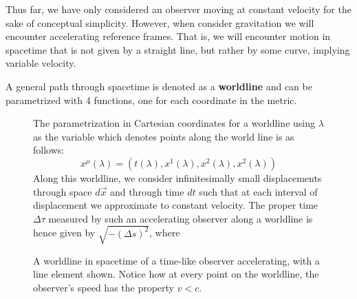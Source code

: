 \documentclass{article}
\begin{document}
 		Thus far, we have only considered an observer moving at constant velocity for the sake of conceptual simplicity. However, when consider gravitation we will encounter accelerating reference frames. That is, we will encounter motion in spacetime that is not given by a straight line, but rather by some curve, implying variable velocity. 
 		\begin{defn}
 			A general path through spacetime is denoted as a \textbf{worldline} and can be parametrized with 4 functions, one for each coordinate in the metric.
 		\end{defn}
 		\begin{figure}[h]
 			\begin{minipage}{0.4\textwidth}
 				\center
 				\caption{A worldline in spacetime of a time-like observer accelerating, with a line element shown. Notice how at every point on the worldline, the observer's speed has the property $v<c$.}
 			\end{minipage}
 			\hfill
 			\begin{minipage}{0.56\textwidth}
 				\begin{spacing}{1.5}
 					The parametrization in Cartesian coordinates for a worldline using $\lambda$ as the variable which denotes points along the world line is as follows:
 					$$ x^\mu (\lambda) = \left(t(\lambda), x^1 (\lambda), x^2(\lambda), x^2 (\lambda)\right)$$
 					Along this worldline, we consider infinitesimally small displacements through space $d\vec{x}$ and through time $dt$ such that at each interval of displacement we approximate to constant velocity. The proper time $\Delta \tau$ measured by such an accelerating observer along a worldline is hence given by $\sqrt{-(\Delta s)^2}$, where
 				\end{spacing}
 			\end{minipage}
 		\end{figure}
\end{document}
